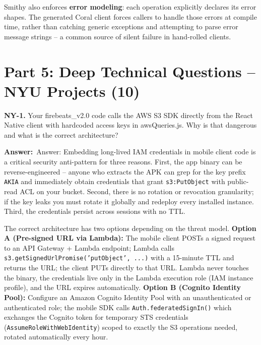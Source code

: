 \documentclass[letterpaper,10pt]{article}
\newlength{\boxwidth}
\newcommand{\answerlabel}{\noindent\textbf{\textcolor{answerblue}{Answer:}}~}
\begin{document}
Smithy also enforces \textbf{error modeling}: each operation explicitly declares its error shapes. The generated Coral client forces callers to handle those errors at compile time, rather than catching generic exceptions and attempting to parse error message strings -- a common source of silent failure in hand-rolled clients.

\newpage

\section{Part 5: Deep Technical Questions -- NYU Projects (10)}

\colorbox{qbg}{\begin{minipage}{\boxwidth}
\textbf{NY-1.} Your firebeats\_v2.0 code calls the AWS S3 SDK directly from the React Native client with hardcoded access keys in awsQueries.js. Why is that dangerous and what is the correct architecture?
\end{minipage}}

\vspace{2pt}
\answerlabel{Answer:} Embedding long-lived IAM credentials in mobile client code is a critical security anti-pattern for three reasons. First, the app binary can be reverse-engineered -- anyone who extracts the APK can grep for the key prefix \texttt{AKIA} and immediately obtain credentials that grant \texttt{s3:PutObject} with public-read ACL on your bucket. Second, there is no rotation or revocation granularity; if the key leaks you must rotate it globally and redeploy every installed instance. Third, the credentials persist across sessions with no TTL.

The correct architecture has two options depending on the threat model. \textbf{Option A (Pre-signed URL via Lambda):} The mobile client POSTs a signed request to an API Gateway + Lambda endpoint; Lambda calls \texttt{s3.getSignedUrlPromise('putObject', ...)} with a 15-minute TTL and returns the URL; the client PUTs directly to that URL. Lambda never touches the binary, the credentials live only in the Lambda execution role (IAM instance profile), and the URL expires automatically. \textbf{Option B (Cognito Identity Pool):} Configure an Amazon Cognito Identity Pool with an unauthenticated or authenticated role; the mobile SDK calls \texttt{Auth.federatedSignIn()} which exchanges the Cognito token for temporary STS credentials (\texttt{AssumeRoleWithWebIdentity}) scoped to exactly the S3 operations needed, rotated automatically every hour.
\end{document}
